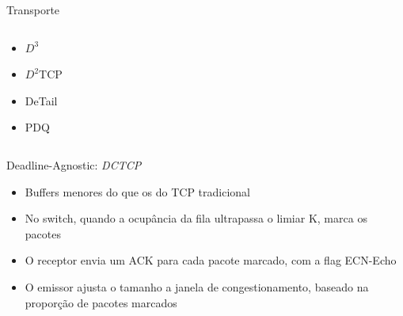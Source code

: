 \documentclass[aspectratio=169]{beamer}
\begin{document}
\begin{frame} {Transporte}
\begin{columns}[t]
\begin{itemize}
\begin{itemize}
                    \item
                          $D^3$
                
                    \item
                            $D^2$TCP
                
                     \item
                        DeTail 
                        
                       \item
                        PDQ 
                                
                \end{itemize}
                        
             \end{itemize}
          \end{columns} 
         
	    \end{frame}
	       
	
	
	
	\begin{frame} {Deadline-Agnostic: \textit{DCTCP}}
	    
	    \Large
	    \begin{itemize}
	                                 
	        \item
	          Buffers menores do que os do TCP tradicional
	        \item
	          No switch, quando a ocupância da fila ultrapassa o limiar K, marca os pacotes
	        \item
	          O receptor envia um ACK para cada pacote marcado, com a flag ECN-Echo
	        \item
	          O emissor ajusta o tamanho a janela de congestionamento, baseado na proporção de pacotes marcados     
	
	    \end{itemize}
	  
	\end{frame}
	  
\end{document}
